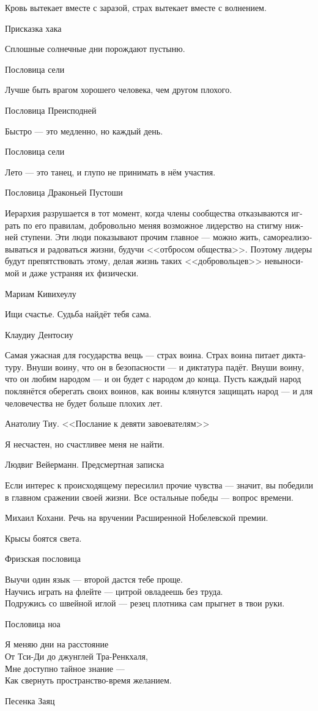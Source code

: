 \documentclass[a4paper,12pt,fleqn]{book}\usepackage{cooltooltips}\usepackage{polyglossia}\setdefaultlanguage[babelshorthands=true]{russian}\setotherlanguage{english}\defaultfontfeatures{Ligatures=TeX,Mapping=tex-text} \usepackage{xcolor}\definecolor{lightgray}{HTML}{bbbbbb}\color{lightgray}\newcommand{\ml}[3]{\textenglish{\textcolor{black}{#3}}}
\begin{document}
{\epigraph
{Кровь вытекает вместе с заразой, страх вытекает вместе с волнением.}
{Присказка хака}

\epigraph
{Сплошные солнечные дни порождают пустыню.}
{Пословица сели}

\epigraph
{Лучше быть врагом хорошего человека, чем другом плохого.}
{Пословица Преисподней}

\epigraph
{Быстро --- это медленно, но каждый день.}
{Пословица сели}

\epigraph
{Лето --- это танец, и глупо не принимать в нём участия.}
{Пословица Драконьей Пустоши}

\epigraph
{Иерархия разрушается в тот момент, когда члены сообщества отказываются играть по его правилам, добровольно меняя возможное лидерство на стигму нижней ступени.
Эти люди показывают прочим главное --- можно жить, самореализовываться и радоваться жизни, будучи <<отбросом общества>>.
Поэтому лидеры будут препятствовать этому, делая жизнь таких <<добровольцев>> невыносимой и даже устраняя их физически.}
{Мариам Кивихеулу}

\epigraph
{Ищи счастье.
Судьба найдёт тебя сама.}
{Клаудиу Дентосиу}

\epigraph
{Самая ужасная для государства вещь --- страх воина.
Страх воина питает диктатуру.
Внуши воину, что он в безопасности --- и диктатура падёт.
Внуши воину, что он любим народом --- и он будет с народом до конца.
Пусть каждый народ поклянётся оберегать своих воинов, как воины клянутся защищать народ --- и для человечества не будет больше плохих лет.}
{Анатолиу Тиу.
<<Послание к девяти завоевателям>>}

\epigraph
{Я несчастен, но счастливее меня не найти.}
{Людвиг Вейерманн.
Предсмертная записка}

\epigraph
{Если интерес к происходящему пересилил прочие чувства --- значит, вы победили в главном сражении своей жизни.
Все остальные победы --- вопрос времени.}
{Михаил Кохани.
Речь на вручении Расширенной Нобелевской премии.}

\epigraph
{Крысы боятся света.}
{Фризская пословица}

\epigraph
{Выучи один язык --- второй дастся тебе проще.\\
Научись играть на флейте --- цитрой овладеешь без труда.\\
Подружись со швейной иглой --- резец плотника сам прыгнет в твои руки.}
{Пословица ноа}

\epigraph
{Я меняю дни на расстояние\\
От Тси-Ди до джунглей Тра-Ренкхаля,\\
Мне доступно тайное знание ---\\
Как свернуть пространство-время желанием.}
{Песенка Заяц}

}
\end{document}
